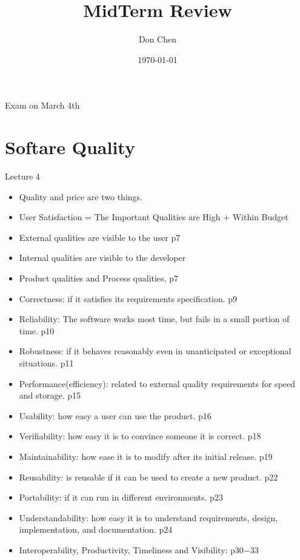 \documentclass[12pt]{article}
\title{MidTerm Review}
\author{Don Chen}
\date{\today}
\begin{document}
\maketitle
Exam on March 4th

\section{Softare Quality}
Lecture 4
\begin{itemize}
    \item Quality and price are two things.
    \item User Satisfaction = The Important Qualities are High $+$ Within Budget
    \item External qualities are visible to the user p7
    \item Internal qualities are visible to the developer
    \item Product qualities and Process qualities, p7
    \item Correctness: if it satisfies its requirements specification. p9
    \item Reliability: The software works most time, but fails in a small portion of time. p10
    \item Robustness: if it behaves reasonably even in unanticipated or exceptional situations. p11
    \item Performance(efficiency): related to external quality requirements for speed and storage. p15
    \item Usability: how easy a user can use the product. p16
    \item Verifiability: how easy it is to convince someone it is correct. p18
    \item Maintainability: how ease it is to modify after its initial release. p19
    \item Reusability: is reusable if it can be used to create a new product. p22
    \item Portability: if it can run in different environments. p23
    \item Understandability: how easy it is to understand requirements, design, implementation, and documentation. p24
    \item Interoperability, Productivity, Timeliness and Visibility: p30$-$33
\end{itemize}
\end{document}
